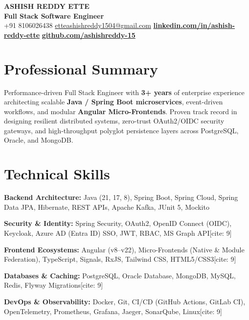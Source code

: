 \documentclass[a4paper,10pt]{article}
\begin{document}
\begin{center}
    {\fontsize{20}{23}\selectfont \textbf{\color{PrimaryText}ASHISH REDDY ETTE}} \\[3pt]
    {\normalsize\textbf{\color{AccentColor}Full Stack Software Engineer}} \enspace{\color{RuleColor}$|$} \\[3pt]
    {\small\color{SubtleText}
      +91 8106026438 \enspace{\color{RuleColor}$\bullet$}\enspace 
      \href{mailto:etteashishreddy1504@gmail.com}{\color{PrimaryText}etteashishreddy1504@gmail.com} \enspace{\color{RuleColor}$\bullet$}\enspace 
      \href{https://www.linkedin.com/in/ashish-reddy-ette-5286a1196/}{\color{AccentColor}\textbf{linkedin.com/in/ashish-reddy-ette}} \enspace{\color{RuleColor}$\bullet$}\enspace 
      \href{https://github.com/ashishreddy-15}{\color{AccentColor}\textbf{github.com/ashishreddy-15}}
    }
\end{center}
\vspace{-8pt}

\section{Professional Summary}
\small{
Performance-driven Full Stack Engineer with \textbf{3+ years} of enterprise experience architecting scalable \textbf{Java / Spring Boot microservices}, event-driven workflows, and modular \textbf{Angular Micro-Frontends}. Proven track record in designing resilient distributed systems, zero-trust OAuth2/OIDC security gateways, and high-throughput polyglot persistence layers across PostgreSQL, Oracle, and MongoDB.
}

\section{Technical Skills}
\begin{itemize}[leftmargin=0.0in, label={}, itemsep=2pt, topsep=1pt]
  \small{
    \item{\textbf{\color{PrimaryText}Backend Architecture:}} Java (21, 17, 8), Spring Boot, Spring Cloud, Spring Data JPA, Hibernate, REST APIs, Apache Kafka, JUnit 5, Mockito
    \item{\textbf{\color{PrimaryText}Security \& Identity:}} Spring Security, OAuth2, OpenID Connect (OIDC), Keycloak, Azure AD (Entra ID) SSO, JWT, RBAC, MS Graph API[cite: 9]
    \item{\textbf{\color{PrimaryText}Frontend Ecosystems:}} Angular (v8--v22), Micro-Frontends (Native \& Module Federation), TypeScript, Signals, RxJS, Tailwind CSS, HTML5/CSS3[cite: 9]
    \item{\textbf{\color{PrimaryText}Databases \& Caching:}} PostgreSQL, Oracle Database, MongoDB, MySQL, Redis, Flyway Migrations[cite: 9]
    \item{\textbf{\color{PrimaryText}DevOps \& Observability:}} Docker, Git, CI/CD (GitHub Actions, GitLab CI), OpenTelemetry, Prometheus, Grafana, Jaeger, SonarQube, Linux[cite: 9]
  }
\end{itemize}
\end{document}
